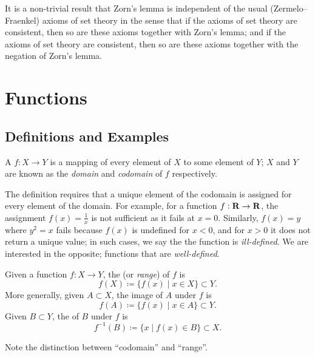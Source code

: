 \begin{remark}
It is a non-trivial result that Zorn's lemma is independent of the usual (Zermelo--Fraenkel) axioms of set theory in the sense that if the axioms of set theory are consistent, then so are these axioms together with Zorn's lemma; and if the axioms of set theory are consistent, then so are these axioms together with the negation of Zorn's lemma.
\end{remark}
\pagebreak

\section{Functions}
\subsection{Definitions and Examples}
\begin{definition}[Function]
A  $f:X\to Y$ is a mapping of every element of $X$ to some element of $Y$; $X$ and $Y$ are known as the \emph{domain} and \emph{codomain} of $f$ respectively.
\end{definition}

\begin{remark}
The definition requires that a unique element of the codomain is assigned for every element of the domain. For example, for a function $f:\mathbf R \to \mathbf R$, the assignment $f(x)=\frac{1}{x}$ is not sufficient as it fails at $x=0$. Similarly, $f(x)=y$ where $y^2=x$ fails because $f(x)$ is undefined for $x<0$, and for $x>0$ it does not return a unique value; in such cases, we say the the function is \emph{ill-defined}. We are interested in the opposite; functions that are \emph{well-defined}.
\end{remark}

\begin{definition}
Given a function $f:X \to Y$, the  (or \emph{range}) of $f$ is
\[f(X)\coloneqq\{f(x)\mid x\in X\}\subset Y.\]
More generally, given $A \subset X$, the image of $A$ under $f$ is
\[f(A)\coloneqq\{f(x)\mid x\in A\}\subset Y.\]
Given $B \subset Y$, the  of $B$ under $f$ is
\[f^{-1}(B)\coloneqq\{x\mid f(x)\in B\}\subset X.\]
\end{definition}

\begin{remark}
Note the distinction between ``codomain'' and ``range''.
\end{remark}

